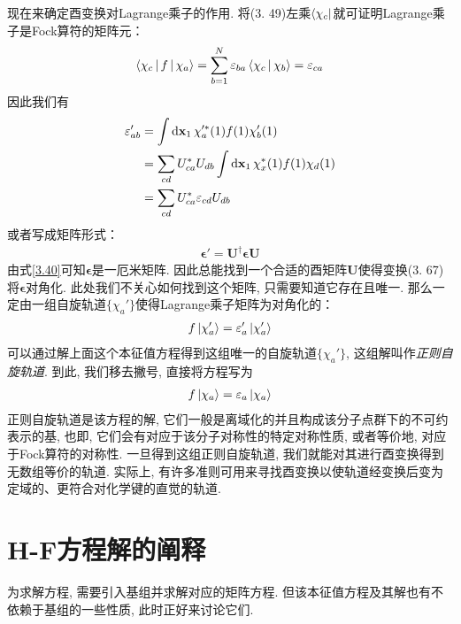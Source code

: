 现在来确定酉变换对Lagrange乘子的作用. 
将(3.
49)左乘$\Bra{\chi_c}$就可证明Lagrange乘子是Fock算符的矩阵元：
\begin{align}
	\Braket{\chi_c|f|\chi_a} = \sum_{b=1}^{N}\varepsilon_{ba}\Braket{\chi_c|\chi_b} = \varepsilon_{ca}
\end{align}
因此我们有
\begin{align}
	\epsilon_{ab}' & = \int\dd{x}_1\,\chi_a^{\prime *}(1)f(1)\chi_b'(1)\notag\\
	& = \sum_{cd}U_{ca}^* U_{db}\int\dd{x}_1\,\chi_x^*(1)f(1)\chi_d(1)\notag\\
	& = \sum_{cd}U_{ca}^* \epsilon_{cd} U_{db}
\end{align}
或者写成矩阵形式：
\begin{align}
	\bm{\epsilon}' = \mathbf{U}^\dagger \bm{\epsilon}\mathbf{U}
\end{align}
由式\eqref{3.40}可知$\bm{\epsilon}$是一厄米矩阵. 
因此总能找到一个合适的酉矩阵$\mathbf{U}$使得变换(3.
67)将$\bm{\epsilon}$对角化. 
此处我们不关心如何找到这个矩阵, 
只需要知道它存在且唯一. 
那么一定由一组自旋轨道$\{\chi_a'\}$使得Lagrange乘子矩阵为对角化的：
\begin{align}
	f\Ket{\chi_a'} = \varepsilon_a'\Ket{\chi_a'}
\end{align}
可以通过解上面这个本征值方程得到这组唯一的自旋轨道$\{\chi_a'\}$, 
这组解叫作\emph{正则自旋轨道}. 
到此, 
我们移去撇号, 
直接将\hft 方程写为
\begin{align}
	f\Ket{\chi_a} = \varepsilon_a\Ket{\chi_a}
\end{align}
正则自旋轨道是该方程的解, 
它们一般是离域化的并且构成该分子点群下的不可约表示的基, 
也即, 
它们会有对应于该分子对称性的特定对称性质, 
或者等价地, 
对应于Fock算符的对称性. 
一旦得到这组正则自旋轨道, 
我们就能对其进行酉变换得到无数组等价的轨道. 
实际上, 
有许多准则可用来寻找酉变换以使轨道经变换后变为定域的、更符合对化学键的直觉的轨道.

\section{H-F方程解的阐释}
为求解\hft 方程, 
需要引入基组并求解对应的矩阵方程. 
但该本征值方程及其解也有不依赖于基组的一些性质, 
此时正好来讨论它们.

